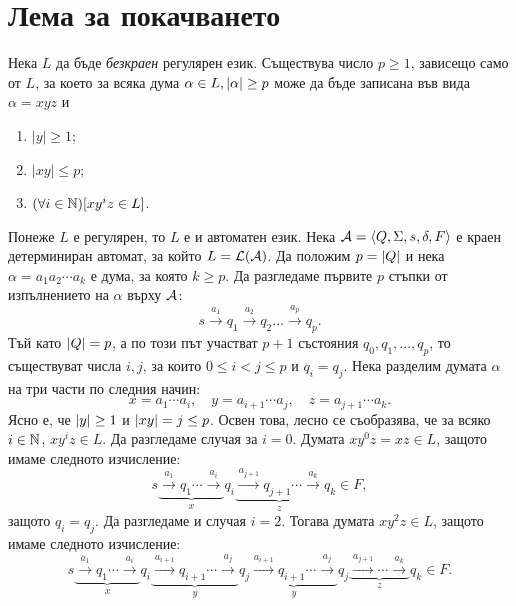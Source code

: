 \section{Лема за покачването}

\begin{lemma}[за покачването]
  \label{lem:pumping-reg}
  Нека $L$ да бъде {\em безкраен} регулярен език.
  Съществува число $p\geq 1$, зависещо само от $L$, 
  за което за всяка дума $\alpha\in L, \lvert{\alpha}\rvert\geq p$ може да 
  бъде записана във вида $\alpha = xyz$ и 
  \begin{enumerate}[1)]
  \item
    $|y|\geq 1$;
  \item
    $|xy|\leq p$;
  \item
    $(\forall i\in\mathbb{N})[xy^iz \in L]$.
  \end{enumerate}
\end{lemma}
\begin{hint}
  Понеже $L$ е регулярен, то $L$ е и автоматен език. Нека $\mathcal{A} = \langle{Q,\Sigma,s,\delta,F}\rangle$ е краен детерминиран 
  автомат, за който $L = \mathcal{L}(\mathcal{A})$.
  Да положим $p = \lvert{Q}\rvert$ и нека $\alpha = a_1a_2\cdots a_k$ е дума, за която $k \geq p$.
  Да разгледаме първите $p$ стъпки от изпълнението на $\alpha$ върху $\mathcal{A}$:
  \[s\stackrel{a_1}{\rightarrow} q_1 \stackrel{a_2}{\rightarrow}q_2 \dots \stackrel{a_p}{\rightarrow} q_p.\]
  Тъй като $\lvert{Q}\rvert = p$, а по този път участват $p+1$ състояния $q_0,q_1,\dots,q_p$,
  то съществуват числа $i, j$, за които $0\leq i < j\leq p$ и $q_i = q_j$.
  Нека разделим думата $\alpha$ на три части по следния начин:
  \[x = a_1\cdots a_i,\quad y = a_{i+1}\cdots a_j,\quad z = a_{j+1}\cdots a_k.\]
  Ясно е, че $\lvert{y}\rvert \geq 1$ и $\lvert{xy}\rvert = j \leq p$.
  Освен това, лесно се съобразява, че за всяко $i \in\mathbb{N}$,
  $xy^iz \in L$. Да разгледаме случая за $i = 0$.
  Думата $xy^0z = xz \in L$, защото имаме следното изчисление:
  \[s\underbrace{\stackrel{a_1}{\rightarrow}q_1 \cdots \stackrel{a_i}{\rightarrow}}_{x} q_i\underbrace{\stackrel{a_{j+1}}{\rightarrow}q_{j+1}\cdots\stackrel{a_{k}}{\rightarrow}}_{z}q_k\in F,\]
  защото $q_i = q_j$.
  Да разгледаме и случая $i = 2$. Тогава думата $xy^2z \in L$, защото имаме следното изчисление:
  \[s\underbrace{\stackrel{a_1}{\rightarrow}q_1 \cdots \stackrel{a_i}{\rightarrow}}_{x} q_i\underbrace{\stackrel{a_{i+1}}{\rightarrow}q_{i+1}\cdots\stackrel{a_{j}}{\rightarrow}}_{y}q_j\underbrace{\stackrel{a_{i+1}}{\rightarrow}q_{i+1}\cdots\stackrel{a_{j}}{\rightarrow}}_{y}q_j\underbrace{\stackrel{a_{j+1}}{\rightarrow}\cdots\stackrel{a_{k}}{\rightarrow}}_{z}q_k\in F.\]
\end{hint}

